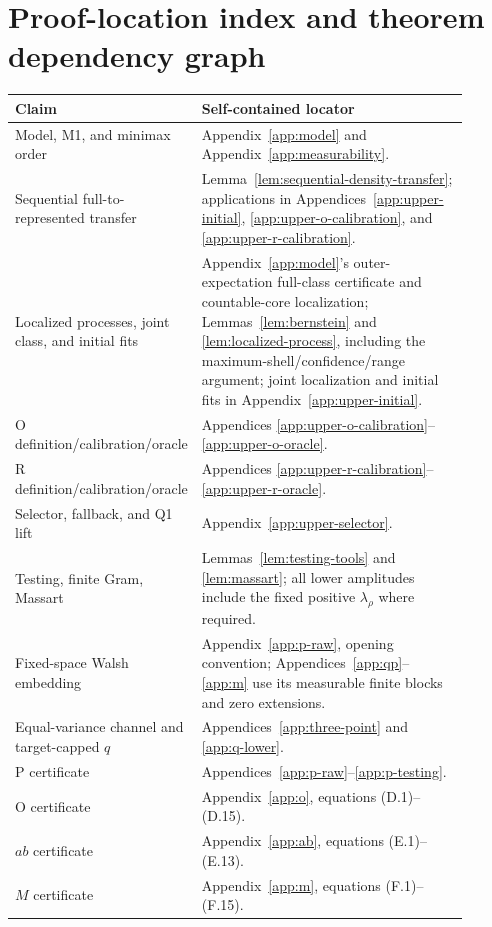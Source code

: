 \section{Proof-location index and theorem dependency graph}
\label{app:proof-index}

\begin{center}
\small
\begin{tabular}{L{0.26\linewidth}L{0.64\linewidth}}
\toprule
Claim & Self-contained locator \\
\midrule
Model, M1, and minimax order & Appendix~\ref{app:model} and
Appendix~\ref{app:measurability}. \\
Sequential full-to-represented transfer &
Lemma~\ref{lem:sequential-density-transfer}; applications in
Appendices~\ref{app:upper-initial}, \ref{app:upper-o-calibration}, and
\ref{app:upper-r-calibration}. \\
Localized processes, joint class, and initial fits &
Appendix~\ref{app:model}'s outer-expectation full-class certificate and
countable-core localization; Lemmas~\ref{lem:bernstein} and
\ref{lem:localized-process}, including the maximum-shell/confidence/range argument; joint localization and initial fits in Appendix~\ref{app:upper-initial}. \\
O definition/calibration/oracle & Appendices
\ref{app:upper-o-calibration}--\ref{app:upper-o-oracle}. \\
R definition/calibration/oracle & Appendices
\ref{app:upper-r-calibration}--\ref{app:upper-r-oracle}. \\
Selector, fallback, and Q1 lift & Appendix~\ref{app:upper-selector}. \\
Testing, finite Gram, Massart & Lemmas~\ref{lem:testing-tools} and
\ref{lem:massart}; all lower amplitudes include the fixed positive
\(\lambda_\rho\) where required. \\
Fixed-space Walsh embedding & Appendix~\ref{app:p-raw}, opening convention;
Appendices~\ref{app:qp}--\ref{app:m} use its measurable finite blocks and zero extensions. \\
Equal-variance channel and target-capped \(q\) &
Appendices~\ref{app:three-point} and \ref{app:q-lower}. \\
P certificate & Appendices~\ref{app:p-raw}--\ref{app:p-testing}. \\
O certificate & Appendix~\ref{app:o}, equations (D.1)--(D.15). \\
\(ab\) certificate & Appendix~\ref{app:ab}, equations (E.1)--(E.13). \\
\(M\) certificate & Appendix~\ref{app:m}, equations (F.1)--(F.15). \\

\end{tabular}
\end{center}
